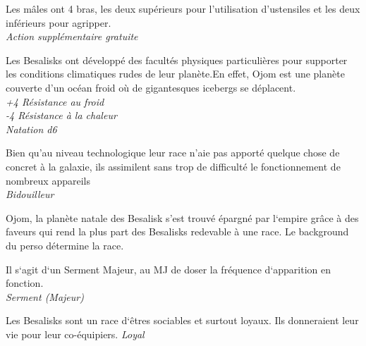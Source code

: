 \begin{description}[align=left]
\item [A bras le corps]         %
    Les mâles ont 4 bras, les deux supérieurs pour l’utilisation d’ustensiles et les deux inférieurs pour agripper.\\
    \emph{Action supplémentaire gratuite} 

\item [Pas frileux]             %
    Les Besalisks ont développé des facultés physiques particulières pour supporter les conditions climatiques rudes de leur planète.En effet, Ojom est une planète couverte d'un océan froid où de gigantesques icebergs se déplacent.\\
    \emph{+4 Résistance au froid}\\
    \emph{-4 Résistance à la chaleur}\\
    \emph{Natation d6}

\item [Bricoleur]               %
    Bien qu'au niveau technologique leur race n’aie pas apporté quelque chose de concret à la galaxie, ils assimilent sans trop de difficulté le fonctionnement de nombreux appareils\\
    \emph{Bidouilleur}

\item [Dette de Libertè]        %
    Ojom, la planète natale des Besalisk s’est trouvé épargné par l‘empire grâce à des faveurs qui rend la plus part des Besalisks redevable à une race. Le background du perso détermine la race.

    Il s‘agit d‘un Serment Majeur, au MJ de doser la fréquence d‘apparition en fonction.\\
    \emph{Serment (Majeur)}

\item [Loyal]                   %
    Les Besalisks sont un race d‘êtres sociables et surtout loyaux. Ils donneraient leur vie pour leur co-équipiers.
    \emph{Loyal}
\end{description}
